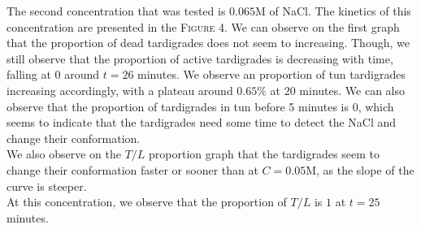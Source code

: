 \documentclass[12pt,a4paper, twocolumn]{article}
\begin{document}
The second concentration that was tested is $0.065$M of NaCl. The kinetics of this concentration are presented in the \textsc{Figure} 4. We can observe on the first graph that the proportion of dead tardigrades does not seem to increasing. Though, we still observe that the proportion of active tardigrades is decreasing with time, falling at $0$ around $t=26$ minutes. We observe an proportion of tun tardigrades increasing accordingly, with a plateau around $0.65\%$ at 20 minutes. We can also observe that the proportion of tardigrades in tun before 5 minutes is 0, which seems to indicate that the tardigrades need some time to detect the NaCl and change their conformation.\\
We also observe on the $T/L$ proportion graph that the tardigrades seem to change their conformation faster or sooner than at $C=0.05$M, as the slope of the curve is steeper.\\
At this concentration, we observe that the proportion of $T/L$ is $1$ at $t=25$ minutes.
\end{document}
